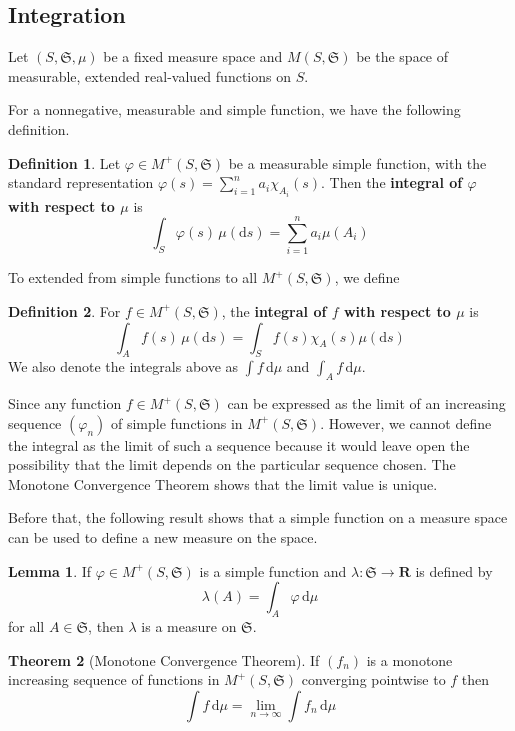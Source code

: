 \documentclass[12pt,a4paper]{article}
\theoremstyle{definition}
\newtheorem{theorem}{Theorem}[section]
\newtheorem{lemma}[theorem]{Lemma}
\newtheorem{definition}{Definition}[section]
\begin{document}
\subsection{Integration}

Let $(S, \mathfrak{S}, \mu)$ be a fixed measure space and $M(S, \mathfrak{S})$ be the space of measurable, extended real-valued functions on $S$. 

For a nonnegative, measurable and simple function, we have the following definition.

\begin{definition}
	Let $\varphi \in M^+(S, \mathfrak{S})$ be a measurable simple function, with the standard representation $\varphi(s) = \sum_{i=1}^n a_i \chi_{A_i}(s)$. Then the \textbf{integral of $\varphi$ with respect to $\mu$} is 
	\[
		\int_S \varphi(s) \, \mu(\mathrm{d} s) = \sum_{i=1}^n a_i \mu(A_i)
	\]
\end{definition}

To extended from simple functions to all $M^+(S, \mathfrak{S})$, we define

\begin{definition}
	For $f \in M^+(S, \mathfrak{S})$, the \textbf{integral of $f$ with respect to $\mu$} is 
	\[
		\int_A f(s) \, \mu(\mathrm{d}s) = \int_S f(s) \chi_A (s) \mu(\mathrm{d}s)
	\]
	We also denote the integrals above as $\int f \, \mathrm{d} \mu$ and $\int_A f \, \mathrm{d} \mu$. 
\end{definition}

Since any function $f \in M^+(S, \mathfrak{S})$ can be expressed as the limit of an increasing sequence $(\varphi_n)$ of simple functions in $M^+(S, \mathfrak{S})$. However, we cannot define the integral as the limit of such a sequence because it would leave open the possibility that the limit depends on the particular sequence chosen. The Monotone Convergence Theorem shows that the limit value is unique.

Before that, the following result shows that a simple function on a measure space can be used to define a new measure on the space.

\begin{lemma}
	If $\varphi \in M^+(S, \mathfrak{S})$ is a simple function and $\lambda: \mathfrak{S} \longrightarrow \textbf{R}$ is defined by
	\[
		\lambda(A) = \int_A \varphi\, \mathrm{d}\mu 
	\]
	for all $A \in \mathfrak{S}$, then $\lambda$ is a measure on $\mathfrak{S}$.
\end{lemma}

\begin{theorem}[Monotone Convergence Theorem]
	If $(f_n)$ is a monotone increasing sequence of functions in $M^+(S, \mathfrak{S})$ converging pointwise to $f$ then 
	\[
		\int f\, \mathrm{d}\mu = \lim_{n \to \infty} \int f_n \, \mathrm{d} \mu
	\]
\end{theorem}
\end{document}
